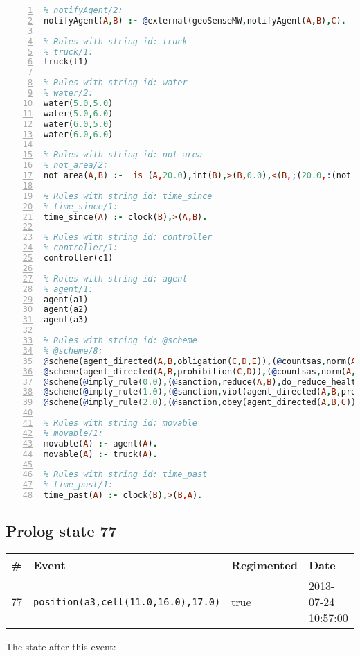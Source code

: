 \documentclass[11pt]{article}\usepackage[utf8]{inputenc}\usepackage{geometry}
\begin{document}
\begin{lstlisting}[language=Prolog, numbers=left]
% Rules with string id: notifyAgent
% notifyAgent/2:
notifyAgent(A,B) :- @external(geoSenseMW,notifyAgent(A,B),C).

% Rules with string id: truck
% truck/1:
truck(t1)

% Rules with string id: water
% water/2:
water(5.0,5.0)
water(5.0,6.0)
water(6.0,5.0)
water(6.0,6.0)

% Rules with string id: not_area
% not_area/2:
not_area(A,B) :-  is (A,20.0),int(B),>(B,0.0),<(B,;(20.0,:(not_area(A,B), is (-(B),20.0)))),int(A),>(A,0.0),<(A,;(20.0,:(area(A,B),-(int(A))))),int(B),>(A,0.0),>(B,0.0),<(A,21.0),<(B,21.0).

% Rules with string id: time_since
% time_since/1:
time_since(A) :- clock(B),>(A,B).

% Rules with string id: controller
% controller/1:
controller(c1)

% Rules with string id: agent
% agent/1:
agent(a1)
agent(a2)
agent(a3)

% Rules with string id: @scheme
% @scheme/8:
@scheme(agent_directed(A,B,obligation(C,D,E)),(@countsas,norm(A,B,F,obligation(C,D,E)),F),false,(listTrue(C)),(time_past(D)),false,[plus(viol(agent_directed(A,B,obligation(C,D,E))))|[]],[plus(obey(agent_directed(A,B,obligation(C,D,E))))|[]])
@scheme(agent_directed(A,B,prohibition(C,D)),(@countsas,norm(A,B,E,prohibition(C,D)),E),(listTrue(C)),false,(false),false,[plus(viol(agent_directed(A,B,prohibition(C,D))))|[]],[plus(obey(agent_directed(A,B,prohibition(C,D))))|[]])
@scheme(@imply_rule(0.0),(@sanction,reduce(A,B),do_reduce_health(A,B),notifyAgent(A,changed(status))),true,false,false,false,[min(reduce(A,B))|[]],[])
@scheme(@imply_rule(1.0),(@sanction,viol(agent_directed(A,B,prohibition(C,D))),do_sanction(D)),true,false,false,false,[min(viol(agent_directed(A,B,prohibition(C,D))))|[]],[])
@scheme(@imply_rule(2.0),(@sanction,obey(agent_directed(A,B,C))),true,false,false,false,[min(obey(agent_directed(A,B,C)))|[]],[])

% Rules with string id: movable
% movable/1:
movable(A) :- agent(A).
movable(A) :- truck(A).

% Rules with string id: time_past
% time_past/1:
time_past(A) :- clock(B),>(B,A).

\end{lstlisting}
\clearpage 
\subsection{Prolog state 77}
\begin{table}[ht]
\centering 
\begin{tabular}{l l l l} 
\textbf{\#} & \textbf{Event} & \textbf{Regimented} & \textbf{Date} \\ [0.5ex] 
\hline
77&\texttt{position(a3,cell(11.0,16.0),17.0)}&true&2013-07-24 10:57:00\\ [1ex] \hline\end{tabular}
\end{table}
The state after this event:
\end{document}
